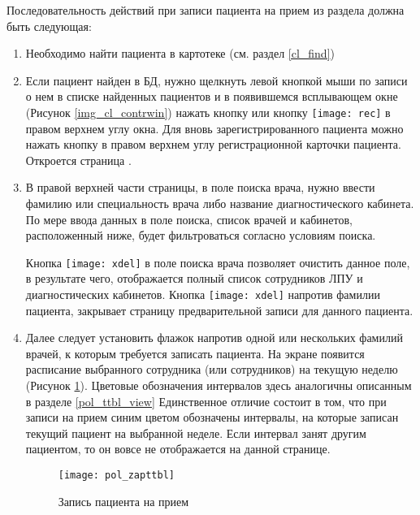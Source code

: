 Последовательность действий при записи пациента на прием  {из раздела }{} должна быть следующая:
\begin{enumerate}
 \item \label{n4} Необходимо найти пациента в картотеке (см. раздел \ref{cl_find}) 
 \item Если пациент найден в БД, нужно щелкнуть левой кнопкой мыши по записи о нем в списке найденных пациентов и в появившемся всплывающем окне (Рисунок \ref{img_cl_contrwin}) нажать кнопку  или кнопку \texttt{[image: rec]} в правом верхнем углу окна. Для вновь зарегистрированного пациента можно нажать кнопку  в правом верхнем углу регистрационной карточки пациента. Откроется страница .  
 \item В правой верхней части страницы, в поле поиска врача, нужно ввести фамилию или специальность врача либо название диагностического кабинета. По мере ввода данных в поле поиска, список врачей и кабинетов, расположенный ниже, будет фильтроваться согласно условиям поиска.
 
 \begin{prim}
   Кнопка  \texttt{[image: xdel]} в поле поиска врача позволяет очистить данное поле, в результате чего, отображается полный список сотрудников ЛПУ и диагностических кабинетов. Кнопка  \texttt{[image: xdel]} напротив фамилии пациента, закрывает страницу предварительной записи для данного пациента.
  \end{prim}
  
 \item \label{n5} Далее следует установить флажок напротив одной или нескольких фамилий врачей, к которым требуется записать пациента. На экране появится расписание выбранного сотрудника (или сотрудников) на текущую неделю (Рисунок \ref{img_pol_zapttbl}). Цветовые обозначения интервалов здесь аналогичны описанным в разделе \ref{pol_ttbl_view} Единственное отличие состоит в том, что при записи на прием  синим цветом обозначены интервалы, на которые записан текущий пациент на выбранной неделе. Если интервал занят другим пациентом, то он вовсе не отображается на данной странице.
 
 \begin{figure}[ht]\centering
  \texttt{[image: pol\_zapttbl]}
  \caption{Запись пациента на прием}
  \label{img_pol_zapttbl}
 \end{figure}
 

\end{enumerate}
